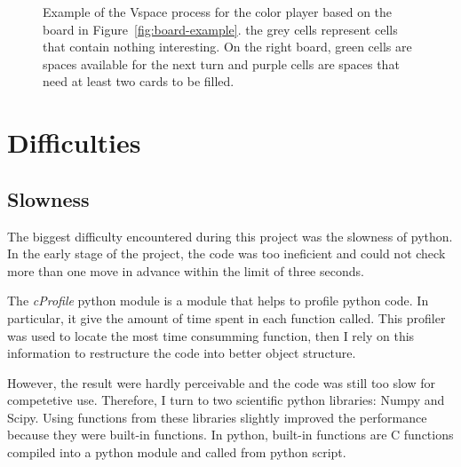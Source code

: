 \documentclass[runningheads]{llncs}
\begin{document}
\begin{figure}[ht]
		\caption{Example of the Vspace process for the
		color player based on the board in
		Figure~\ref{fig:board-example}. the grey cells
		represent cells that contain nothing
		interesting. On the right board, green cells
		are spaces available for the next turn and
		purple cells are spaces that need at least two
		cards to be filled.}
		\label{fig:color-vspace}
\end{figure}
\clearpage
\section{Difficulties}
\subsection{Slowness}
The biggest difficulty encountered during this
project was the slowness of python. In the early
stage of the project, the code was
too ineficient and could not check more than one
move in advance within the limit of three seconds. 

The \textit{cProfile} python module is a module
that helps to profile python code. In particular,
it give the amount of time spent in each function
called. This profiler was used to locate the most
time consumming function, then I rely on this information to
restructure the code into better object structure.

However, the result were hardly perceivable and
the code was still too slow for competetive use.
Therefore, I turn to two scientific python
libraries: Numpy and Scipy. Using functions from
these libraries slightly improved the performance
because they were built-in functions. In python,
built-in functions are C functions compiled into a
python module and called from python script.
\end{document}
